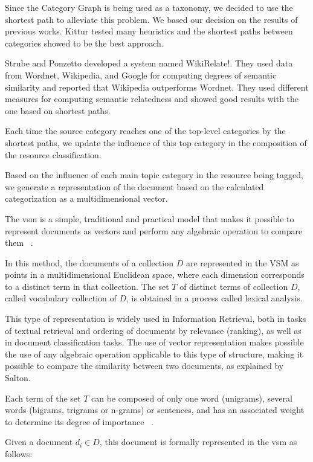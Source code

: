 Since the Category Graph is being used as a taxonomy, we decided to use the shortest path to alleviate this problem. We based our decision on the results of previous works. Kittur\cite{knuth:84} tested many heuristics and the shortest paths between categories showed to be the best approach. 

Strube and Ponzetto\cite{strube2006wikirelate} developed a system named WikiRelate!. They used data from Wordnet, Wikipedia, and Google for computing degrees of semantic similarity and reported that Wikipedia outperforms Wordnet.  They used different measures for computing semantic relatedness and showed good results with the one based on shortest paths.

Each time the source category reaches one of the top-level categories by the shortest paths, we update the influence of this top category in the composition of the resource classification.

Based on the influence of each main topic category in the resource being tagged, we generate a representation of the document based on the calculated categorization as a multidimensional vector.

The \gls{vsm} is a simple, traditional and practical model that makes it possible to represent documents as vectors and perform any algebraic operation to compare them ~\cite{salton1988term}.

In this method, the documents of a collection $D$ are represented in the VSM as points in a multidimensional Euclidean space, where each dimension corresponds to a distinct term in that collection. The set $T$ of distinct terms of collection $D$, called vocabulary collection of $D$, is obtained in a process called lexical analysis.


This type of representation is widely used in Information Retrieval, both in tasks of textual retrieval and ordering of documents by relevance (ranking), as well as in document classification tasks. The use of vector representation makes possible the use of any algebraic operation applicable to this type of structure, making it possible to compare the similarity between two documents, as explained by Salton\cite{Salton:1975}.


Each term of the set $T$ can be composed of only one word (unigrams), several words (bigrams, trigrams or n-grams) or sentences, and has an associated weight to determine its degree of importance ~\cite{salton1988term}.

Given a document $d_i \in D$, this document is formally represented in the \gls{vsm} as follows:

